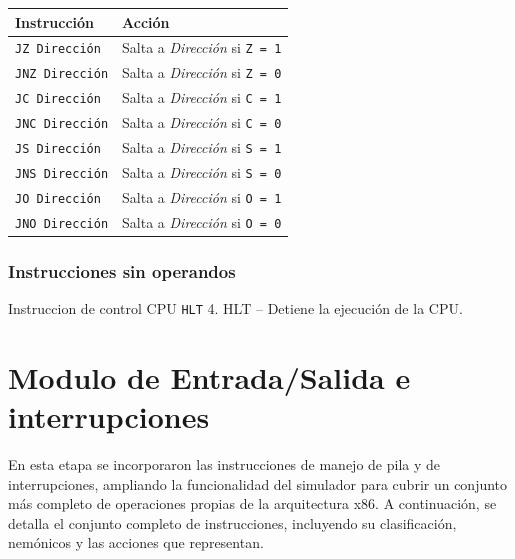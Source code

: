 \documentclass[12pt,oneside]{templates/unerthesis}
\begin{document}
\begin{longtable}[]{@{}ll@{}}
\toprule\noalign{}
Instrucción & Acción \\
\midrule\noalign{}
\endhead
\bottomrule\noalign{}
\endlastfoot
\texttt{JZ\ Dirección} & Salta a \emph{Dirección} si \texttt{Z\ =\ 1} \\
\texttt{JNZ\ Dirección} & Salta a \emph{Dirección} si \texttt{Z\ =\ 0} \\
\texttt{JC\ Dirección} & Salta a \emph{Dirección} si \texttt{C\ =\ 1} \\
\texttt{JNC\ Dirección} & Salta a \emph{Dirección} si \texttt{C\ =\ 0} \\
\texttt{JS\ Dirección} & Salta a \emph{Dirección} si \texttt{S\ =\ 1} \\
\texttt{JNS\ Dirección} & Salta a \emph{Dirección} si \texttt{S\ =\ 0} \\
\texttt{JO\ Dirección} & Salta a \emph{Dirección} si \texttt{O\ =\ 1} \\
\texttt{JNO\ Dirección} & Salta a \emph{Dirección} si \texttt{O\ =\ 0} \\
\end{longtable}

\hypertarget{instrucciones-sin-operandos}{%
\subsubsection{Instrucciones sin operandos}\label{instrucciones-sin-operandos}}

Instruccion de control CPU \texttt{HLT}
4. HLT -- Detiene la ejecución de la CPU.

\hypertarget{modulo-de-entradasalida-e-interrupciones}{%
\section{Modulo de Entrada/Salida e interrupciones}\label{modulo-de-entradasalida-e-interrupciones}}

En esta etapa se incorporaron las instrucciones de manejo de pila y de interrupciones, ampliando la funcionalidad del simulador para cubrir un conjunto más completo de operaciones propias de la arquitectura x86.
A continuación, se detalla el conjunto completo de instrucciones, incluyendo su clasificación, nemónicos y las acciones que representan.
\end{document}
